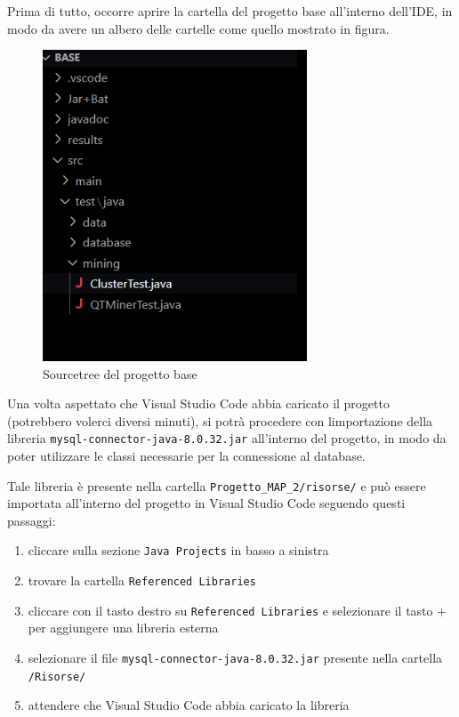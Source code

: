 Prima di tutto, occorre aprire la cartella del progetto base all'interno dell'IDE, in modo da avere un albero delle cartelle come quello mostrato in figura.

\begin{figure}[h!]
    \centering
    \includegraphics[width = 0.7\textwidth]{images/albero cartelle.png}
    \caption{Sourcetree del progetto base}
\end{figure}
Una volta aspettato che Visual Studio Code abbia caricato il progetto (potrebbero volerci diversi minuti), si potrà procedere con limportazione della libreria \texttt{mysql-connector-java-8.0.32.jar} all'interno del progetto, in modo da poter utilizzare le classi necessarie per la connessione al database.

Tale libreria è presente nella cartella \texttt{Progetto\_MAP\_2/risorse/} e può essere importata all'interno del progetto in Visual Studio Code seguendo questi passaggi:

\begin{enumerate}
    \item cliccare sulla sezione \texttt{Java Projects} in basso a sinistra
    \item trovare la cartella \texttt{Referenced Libraries}
    \item cliccare con il tasto destro su \texttt{Referenced Libraries} e selezionare il tasto $+$ per aggiungere una libreria esterna
    \item selezionare il file \texttt{mysql-connector-java-8.0.32.jar} presente nella cartella \texttt{/Risorse/}
    \item attendere che Visual Studio Code abbia caricato la libreria
\end{enumerate}
